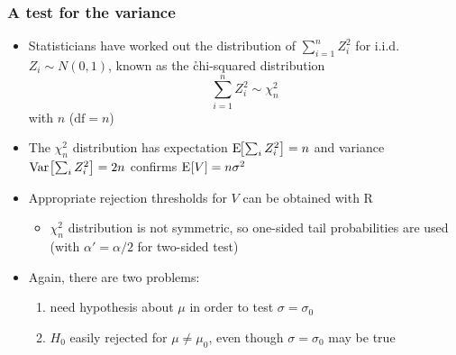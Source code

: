 \documentclass[t]{beamer} %
\begin{document}
\begin{frame}
  \frametitle{A test for the variance}
  
  \begin{itemize}
  \item Statisticians have worked out the distribution of $\sum_{i=1}^n Z_i^2$
    for i.i.d.\ $Z_i\sim N(0,1)$, known as the \h{chi-squared distribution}
    \[
    \sum_{i=1}^n Z_i^2 \sim \chi^2_n
    \]
    with $n$  ($\text{df} = n$)
  \item The $\chi^2_n$ distribution has expectation $\mathrm{E}_{}\!\bigl[\sum_i Z_i^2\bigr] =
    n$ and variance $\mathop{\mathrm{Var}}_{}\bigl[\sum_i Z_i^2\bigr] = 2n$ \so confirms $\mathrm{E}_{}[V] = n \sigma^2$%
    \pause
  \item Appropriate rejection thresholds for $V$ can be obtained with R
    \begin{itemize}
    \item $\chi^2_n$ distribution is not symmetric, so one-sided tail
      probabilities are used (with $\alpha' = \alpha/2$ for two-sided test)
    \end{itemize}
    \pause
  \item Again, there are two problems:
    \begin{enumerate}
    \item need hypothesis about $\mu$ in order to test $\sigma = \sigma_0$
    \item $H_0$ easily rejected for $\mu \neq \mu_0$, even though
      $\sigma=\sigma_0$ may be true
    \end{enumerate}
  \end{itemize}
\end{frame}
\end{document}
